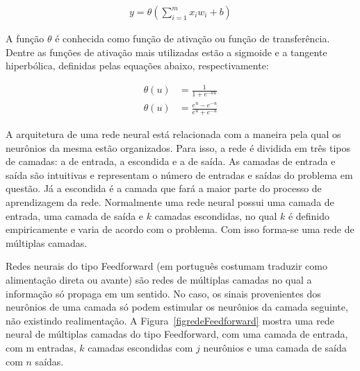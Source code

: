 \begin{equation} \label{eq1}
\begin{split}
y = \theta(\sum_{i=1}^{m} x_i w_i + b)
\end{split}
\end{equation}

A função \(\theta\) é conhecida como função de ativação ou função de transferência. Dentre as funções de ativação mais utilizadas estão a sigmoide e a tangente hiperbólica, definidas pelas equações abaixo, respectivamente:

\begin{equation} \label{eq2}
\begin{split}
\theta(u) & = \frac{1}{1+ e^{-au}}\\
\theta(u) & = \frac{e^u - e^{-u}}{e^u + e^{-u}}
\end{split}
\end{equation}

A arquitetura de uma rede neural está relacionada com a maneira pela qual os neurônios da mesma estão organizados. Para isso, a rede é dividida em três tipos de camadas: a de entrada, a escondida e a de saída. As camadas de entrada e saída são intuitivas e representam o número de entradas e saídas do problema em questão. Já a escondida é a camada que fará a maior parte do processo de aprendizagem da rede. Normalmente uma rede neural possui uma camada de entrada, uma camada de saída e \(k\) camadas escondidas, no qual \(k\) é definido empiricamente e varia de acordo com o problema. Com isso forma-se uma rede de múltiplas camadas.

Redes neurais do tipo Feedforward (em português costumam traduzir como alimentação direta ou avante) são redes de múltiplas camadas no qual a informação só propaga em um sentido. No caso, os sinais provenientes dos neurônios de uma camada só podem estimular os neurônios da camada seguinte, não existindo realimentação. A Figura~\ref{figredeFeedforward} mostra uma rede neural de múltiplas camadas do tipo Feedforward, com uma camada de entrada, com m entradas, \(k\) camadas escondidas com \(j\) neurônios e uma camada de saída com \(n\) saídas.

